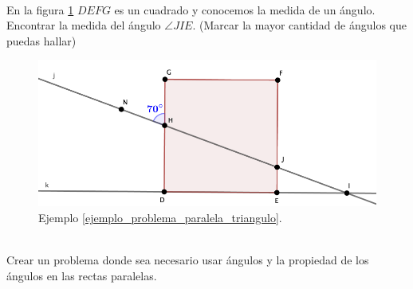 \begin{ejemplo}{\ \\}
	\label{ejemplo_problema_paralela_triangulo} En la figura \ref{problema_paralela_triangulo} $DEFG$ es un cuadrado y conocemos la medida de un ángulo. Encontrar la medida del ángulo $\angle JIE$. (Marcar la mayor cantidad de ángulos que puedas hallar)
	
	\begin{figure}[H]
		\centering
		\includegraphics[width=0.6\linewidth]{Geometria/imgs/problema_paralela_triangulo}
		\caption{Ejemplo \ref{ejemplo_problema_paralela_triangulo}.}
		\label{problema_paralela_triangulo}
	\end{figure}
\end{ejemplo}

\begin{exer}{\ \\}
	Crear un problema donde sea necesario usar ángulos y la propiedad de los ángulos en las rectas paralelas.
\end{exer}

